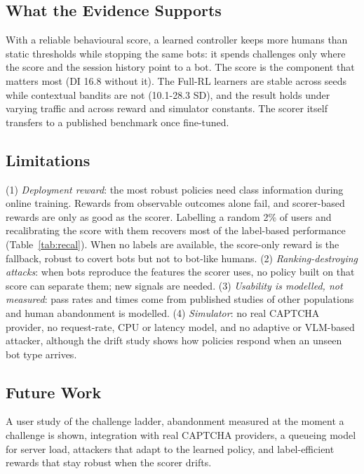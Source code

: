 \documentclass{ieeetj}
\begin{document}
\subsection{What the Evidence Supports}
With a reliable behavioural score, a learned controller keeps more humans than static thresholds while stopping the same bots: it spends challenges only where the score and the session history point to a bot. 
The score is the component that matters most (DI 16.8 without it).
The Full-RL learners are stable across seeds while contextual bandits are not (10.1-28.3 SD), and the result holds under varying traffic and across reward and simulator constants. 
The scorer itself transfers to a published benchmark once fine-tuned.

\vspace{-5pt}
\subsection{Limitations}
(1) \emph{Deployment reward}: the most robust policies need class information during online training. 
Rewards from observable outcomes alone fail, and scorer-based rewards are only as good as the scorer. 
Labelling a random 2\% of users and recalibrating the score with them recovers most of the label-based performance (Table~\ref{tab:recal}).
When no labels are available, the score-only reward is the fallback, robust to covert bots but not to bot-like humans. 
(2) \emph{Ranking-destroying attacks}: when bots reproduce the features the scorer uses, no policy built on that score can separate them; new signals are needed. 
(3) \emph{Usability is modelled, not measured}: pass rates and times come from published studies of other populations and human abandonment is modelled. 
(4) \emph{Simulator}: no real CAPTCHA provider, no request-rate, CPU or latency model, and no adaptive or VLM-based attacker, although the drift study shows how policies respond when an unseen bot type arrives. 

\vspace{-5pt}
\subsection{Future Work}
A user study of the challenge ladder, abandonment measured at the moment a challenge is shown, integration with real CAPTCHA providers, a queueing model for server load, attackers that adapt to the learned policy, and label-efficient rewards that stay robust when the scorer drifts.
\end{document}

